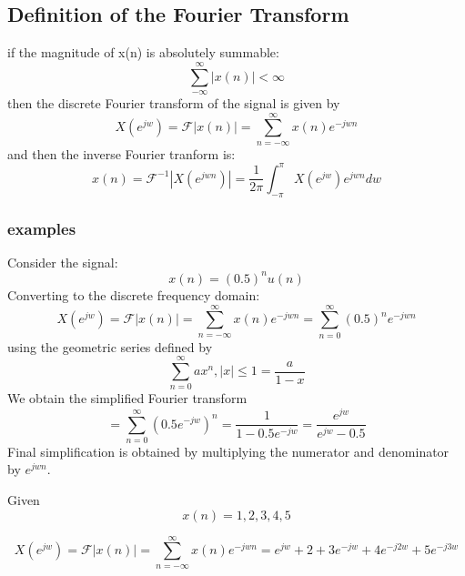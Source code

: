 \documentclass{article}
\newcommand{\fourier}{\mathcal{F}}
\begin{document}
\subsection{Definition of the Fourier Transform}
if the magnitude of x(n) is absolutely summable: \\
\begin{equation}
\sum_{-\infty}^{\infty}|x(n)| < \infty
\end{equation}
then the discrete Fourier transform of the signal is given by \\
\begin{equation}
X(e^{jw})= \fourier|x(n)| = \sum_{n=-\infty}^{\infty}x(n)e^{-jwn}
\end{equation}
and then the inverse Fourier tranform is:
\begin{equation}
x(n) = \fourier^{-1}|X(e^{jwn})|=\frac{1}{2\pi}\int_{-\pi}^{\pi}X(e^{jw})e^{jwn}dw
\end{equation}

\subsubsection{examples}
Consider the signal:\\
\begin{equation}
 x(n) = (0.5)^n u(n)    
\end{equation}
Converting to the discrete frequency domain:
\begin{equation}
X(e^{jw})= \fourier|x(n)| = \sum_{n=-\infty}^{\infty}x(n)e^{-jwn} = \sum_{n=0}^{\infty}(0.5)^ne^{-jwn}
\end{equation}
using the geometric series defined by \\
\begin{equation}
\sum_{n=0}^{\infty}ax^n, |x|\leq1 = \frac{a}{1-x}
\end{equation}
We obtain the simplified Fourier transform 
\begin{equation}
= \sum_{n=0}^{\infty}(0.5e^{-jw})^n = \frac{1}{1-0.5e^{-jw}} =  \frac{e^{jw}}{e^{jw}-0.5}
\end{equation}
Final simplification is obtained by multiplying the numerator and denominator by $e^{jwn}$. \\
\vspace{1em}

Given
\begin{equation}
x(n) = {1,2,3,4,5}
\end{equation}

\begin{equation}
X(e^{jw})= \fourier|x(n)| = \sum_{n=-\infty}^{\infty}x(n)e^{-jwn}= e^{jw}+2+3e^{-jw}+4e^{-j2w}+5e^{-j3w}
\end{equation}
\end{document}
